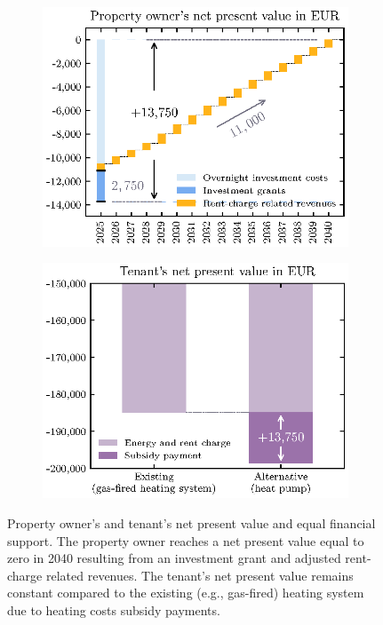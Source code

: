 \documentclass[review]{elsarticle}
\begin{document}
\begin{figure}[h]
	\begin{subfigure}[c]{0.5\textwidth}
		\centering
		\includegraphics[width=1\linewidth]{figures/3_Methodology/Validate-Landlord.eps}
		\label{fig:landlord}
	\end{subfigure}
	\begin{subfigure}[c]{0.5\textwidth}
		\centering
		\includegraphics[width=1\linewidth]{figures/3_Methodology/Validate-Tenant.eps}
		\label{fig:tenant}
	\end{subfigure}
	\caption{Property owner's and tenant's net present value and equal financial support. The property owner reaches a net present value equal to zero in 2040 resulting from an investment grant and adjusted rent-charge related revenues. The tenant's net present value remains constant compared to the existing (e.g., gas-fired) heating system due to heating costs subsidy payments.}
	\label{val:npv}
\end{figure}
\end{document}
